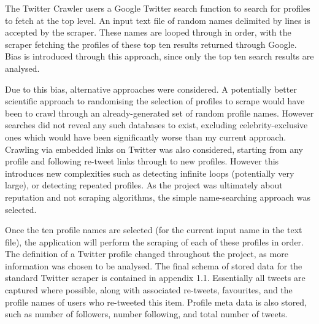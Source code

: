 The Twitter Crawler users a Google Twitter search function to search for profiles to fetch at the top level. An input text file of random names delimited by lines is accepted by the scraper. These names are looped through in order, with the scraper fetching the profiles of these top ten results returned through Google. Bias is introduced through this approach, since only the top ten search results are analysed. 


Due to this bias, alternative approaches were considered. A potentially better scientific approach to randomising the selection of profiles to scrape would have been to crawl through an already-generated set of random profile names. However searches did not reveal any such databases to exist, excluding celebrity-exclusive ones which would have been significantly worse than my current approach. Crawling via embedded links on Twitter was also considered, starting from any profile and following re-tweet links through to new profiles. However this introduces new complexities such as detecting infinite loops (potentially very large), or detecting repeated profiles. As the project was ultimately about reputation and not scraping algorithms, the simple name-searching approach was selected. 

Once the ten profile names are selected (for the current input name in the text file), the application will perform the scraping of each of these profiles in order.  The definition of a Twitter profile changed throughout the project, as more information was chosen to be analysed. The final schema of stored data for the standard Twitter scraper is contained in appendix 1.1. Essentially all tweets are captured where possible, along with associated re-tweets, favourites, and the profile names of users who re-tweeted this item. Profile meta data is also stored, such as number of followers, number following, and total number of tweets. 

